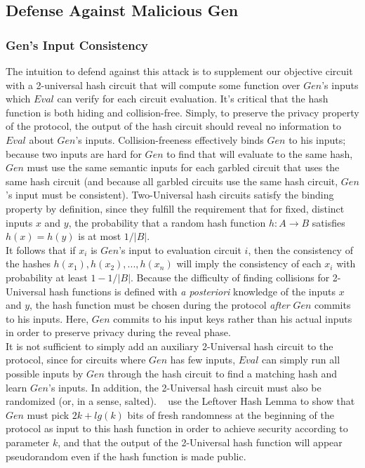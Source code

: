 \documentclass{article}
\begin{document}
\subsection{Defense Against Malicious Gen}

\subsubsection{Gen's Input Consistency} \label{sec:gen-inp-consist-defense}

The intuition to defend against this attack is to supplement our objective circuit with a 2-universal hash circuit that will compute some function over $Gen$'s inputs which $Eval$ can verify for each circuit evaluation. It's critical that the hash function is both hiding and collision-free. Simply, to preserve the privacy property of the protocol, the output of the hash circuit should reveal no information to $Eval$ about $Gen$'s inputs. Collision-freeness effectively binds $Gen$ to his inputs; because two inputs are hard for $Gen$ to find that will evaluate to the same hash, $Gen$ must use the same semantic inputs for each garbled circuit that uses the same hash circuit (and because all garbled circuits use the same hash circuit, $Gen$'s input must be consistent). Two-Universal hash circuits satisfy the binding property by definition, since they fulfill the requirement that for fixed, distinct inputs $x$ and $y$, the probability that a random hash function $h : A \rightarrow B $ satisfies $h(x) = h(y)$ is at most $1/|B|$. \\

It follows that if $x_{i}$ is $Gen$'s input to evaluation circuit $i$, then the consistency of the hashes $h(x_1),h(x_2),...,h(x_n)$ will imply the consistency of each $x_i$ with probability at least $1-1/|B|$. Because the difficulty of finding collisions for 2-Universal hash functions is defined with \emph{a posteriori} knowledge of the inputs $x$ and $y$, the hash function must be chosen during the protocol \emph{after} $Gen$ commits to his inputs. Here, $Gen$ commits to his input keys rather than his actual inputs in order to preserve privacy during the reveal phase. \\

It is not sufficient to simply add an auxiliary 2-Universal hash circuit to the protocol, since for circuits where $Gen$ has few inputs, $Eval$ can simply run all possible inputs by $Gen$ through the hash circuit to find a matching hash and learn $Gen$'s inputs. In addition, the 2-Universal hash circuit must also be randomized (or, in a sense, salted). ~\cite{fast2pc} use the Leftover Hash Lemma to show that $Gen$ must pick $2k + lg(k)$ bits of fresh randomness at the beginning of the protocol as input to this hash function in order to achieve security according to parameter $k$, and that the output of the 2-Universal hash function will appear pseudorandom even if the hash function is made public. \\
\end{document}
